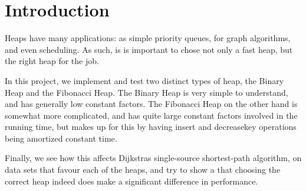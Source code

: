 \section{Introduction}

Heaps have many applications: as simple priority queues, for graph algorithms, and even scheduling. As such, is is important to chose not only a fast heap, but the right heap for the job.

In this project, we implement and test two distinct types of heap, the Binary Heap and the Fibonacci Heap. The Binary Heap is very simple to understand, and has generally low constant factors. The Fibonacci Heap on the other hand is somewhat more complicated, and has quite large constant factors involved in the running time, but makes up for this by having insert and decreasekey operations being amortized constant time.

Finally, we see how this affects Dijkstras single-source shortest-path algorithm, on data sets that favour each of the heaps, and try to show a that choosing the correct heap indeed does make a significant difference in performance. 